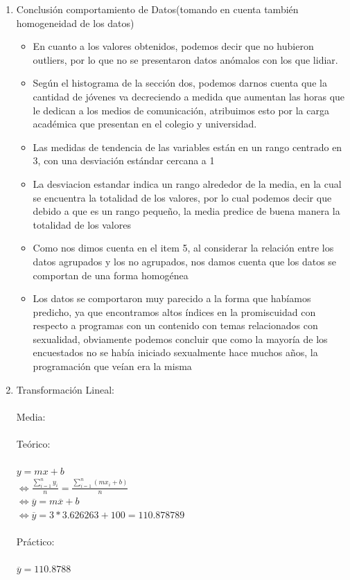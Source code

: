 \documentclass[letterpaper,spanish,11pt]{article}
\begin{document}
\begin{enumerate}
    \item Conclusi\'on comportamiento de Datos(tomando en cuenta tambi\'en homogeneidad de los datos)\\
	\begin{itemize}
		\item En cuanto a los valores obtenidos, podemos decir que no hubieron outliers, por lo que no se presentaron datos an\'omalos con los que lidiar.
		\item Seg\'un el histograma de la secci\'on dos, podemos darnos cuenta que la cantidad de j\'ovenes va decreciendo a medida que aumentan las horas
			que le dedican a los medios de comunicaci\'on, atribuimos esto por la carga acad\'emica que presentan en el colegio y universidad.
		\item Las medidas de tendencia de las variables est\'an en un rango centrado en 3, con una desviaci\'on est\'andar cercana a 1
		\item La desviacion estandar indica un rango alrededor de la media, en la cual se encuentra la totalidad de los valores, por lo cual podemos decir
			 que debido a que es un rango peque\~no, la media predice de buena manera la totalidad de los valores
		\item Como nos dimos cuenta en el item 5, al considerar la relaci\'on entre los datos agrupados y los no agrupados, nos damos cuenta que los datos se
			 comportan de una forma homog\'enea
		\item Los datos se comportaron muy parecido a la forma que hab\'iamos predicho, ya que encontramos altos \'indices en la promiscuidad con respecto a 
			programas con un contenido con temas relacionados con sexualidad, obviamente podemos concluir que como la mayor\'ia de los encuestados no se
			hab\'ia iniciado sexualmente hace muchos a\~nos, la programaci\'on que ve\'ian era la misma
	\end{itemize}	
    \item Transformaci\'on Lineal: \\ \\
	Media: \\ \\
	Te\'orico: \\ \\
	$y = mx + b$ \\
	$\Leftrightarrow \frac{\sum_{i=1}^n y_i}{n} = \frac{\sum_{i=1}^n (m x_i + b)}{n}$ \\
	$\Leftrightarrow \overline{y} = m \overline{x} + b$ \\
	$\Leftrightarrow \overline{y} = 3 * 3.626263 + 100 = 110.878789$ \\ \\
	Pr\'actico: \\ \\
	$\overline{y} = 110.8788$ \\ \\
	

\end{enumerate}
\end{document}
